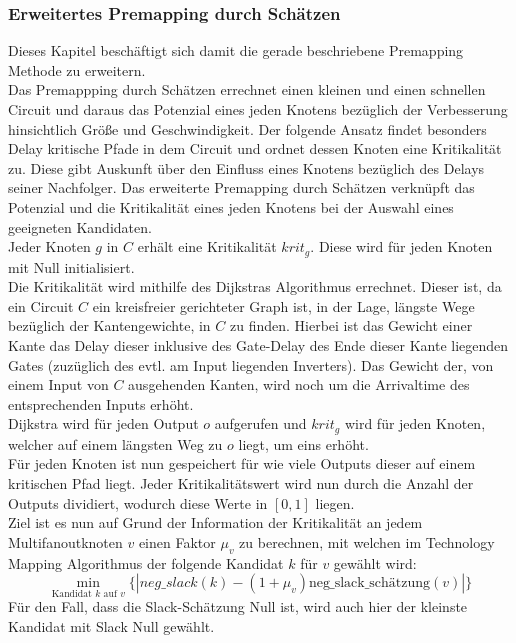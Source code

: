 \documentclass[11pt, a4paper, german]{article}
\newcommand{\TM}{Technology  Mapping }
\begin{document}
\subsubsection{Erweitertes Premapping durch Schätzen}
\label{subsec:erweitertes_premapping_durch_schaetzen}
Dieses Kapitel beschäftigt sich damit die gerade beschriebene Premapping Methode zu erweitern. \\
Das Premappping durch Schätzen errechnet einen kleinen und einen schnellen Circuit und daraus das Potenzial eines jeden Knotens bezüglich der Verbesserung hinsichtlich Größe und Geschwindigkeit. Der folgende Ansatz findet besonders Delay kritische Pfade in dem Circuit und ordnet dessen Knoten eine Kritikalität zu. Diese gibt Auskunft über den Einfluss eines Knotens bezüglich des Delays seiner Nachfolger. Das erweiterte Premapping durch Schätzen verknüpft das Potenzial und die Kritikalität eines jeden Knotens bei der Auswahl eines geeigneten Kandidaten. \\

Jeder Knoten $g$ in $C$ erhält eine Kritikalität $krit_g$. Diese wird für jeden Knoten mit Null initialisiert. \\
Die Kritikalität wird mithilfe des Dijkstras Algorithmus errechnet. Dieser ist, da ein Circuit $C$ ein kreisfreier gerichteter Graph ist, in der Lage, längste Wege bezüglich der Kantengewichte,  in $C$ zu finden. Hierbei ist das Gewicht einer Kante das Delay dieser inklusive des Gate-Delay des Ende dieser Kante liegenden Gates (zuzüglich des evtl. am Input liegenden Inverters). Das Gewicht der, von einem Input von $C$ ausgehenden Kanten, wird noch um die Arrivaltime des entsprechenden Inputs erhöht. \\
Dijkstra wird für jeden Output $o$ aufgerufen und $krit_g$ wird für jeden Knoten, welcher auf einem längsten Weg zu $o$ liegt, um eins erhöht.\\

Für jeden Knoten ist nun gespeichert für wie viele Outputs dieser auf einem kritischen Pfad liegt. Jeder Kritikalitätswert wird nun durch die Anzahl der Outputs dividiert, wodurch diese Werte in $[0,1]$ liegen.\\

Ziel ist es nun auf Grund der Information der Kritikalität an jedem Multifanoutknoten $v$ einen Faktor $\mu_v$ zu berechnen, mit welchen im \TM Algorithmus der folgende Kandidat $k$ für $v$  gewählt wird: 
\[\min\limits_{\text{Kandidat }k\text{ auf }v}\{|neg\_slack(k)-(1+\mu_v)\text{neg\_slack\_sch\"atzung}(v)|\}\]
Für den Fall, dass die Slack-Schätzung Null ist, wird auch hier der kleinste Kandidat mit Slack Null gewählt.\\
\end{document}
